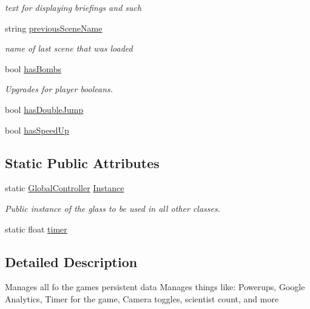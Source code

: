 \begin{DoxyCompactItemize}
\begin{DoxyCompactList}\small\item\em text for displaying briefings and such \end{DoxyCompactList}\item 
string \hyperlink{class_global_controller_a4f18181ee209689f12548533bbe5a6a7}{previous\+Scene\+Name}
\begin{DoxyCompactList}\small\item\em name of last scene that was loaded \end{DoxyCompactList}\item 
bool \hyperlink{class_global_controller_a9ee52888965cba7e6c237d44e0b19c53}{has\+Bombs}
\begin{DoxyCompactList}\small\item\em Upgrades for player booleans. \end{DoxyCompactList}\item 
bool \hyperlink{class_global_controller_ad507e74326e2dc42ce799dba48c27a06}{has\+Double\+Jump}
\item 
bool \hyperlink{class_global_controller_ab7b42d69b264a591d1634da4c3d1866f}{has\+Speed\+Up}
\end{DoxyCompactItemize}
\subsection*{Static Public Attributes}
\begin{DoxyCompactItemize}
\item 
static \hyperlink{class_global_controller}{Global\+Controller} \hyperlink{class_global_controller_a1b49b6838d496def8e3968bdd5dc13ae}{Instance}
\begin{DoxyCompactList}\small\item\em Public instance of the glass to be used in all other classes. \end{DoxyCompactList}\item 
static float \hyperlink{class_global_controller_a93fd9586e6406cde652c06fda4c4d7be}{timer}
\end{DoxyCompactItemize}


\subsection{Detailed Description}
Manages all fo the game\textquotesingle{}s persistent data Manages things like\+: Powerups, Google Analytics, Timer for the game, Camera toggles, scientist count, and more 

